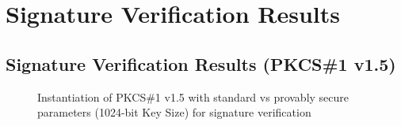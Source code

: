 \documentclass[]{final_report}
\theoremstyle{definition}
\begin{document}
\section{Signature Verification Results}

\subsection{Signature Verification Results (PKCS\#1 v1.5)}
\begin{figure}[H]
    \centering %
     \caption{Instantiation of PKCS\#1 v1.5 with standard vs provably secure parameters (1024-bit Key Size) for signature verification}
    \begin{minipage}{\textwidth}
        \centering
    \end{minipage}
       \label{pkcs_verify_1024bit_table}
  \end{figure}
  
\end{document}
